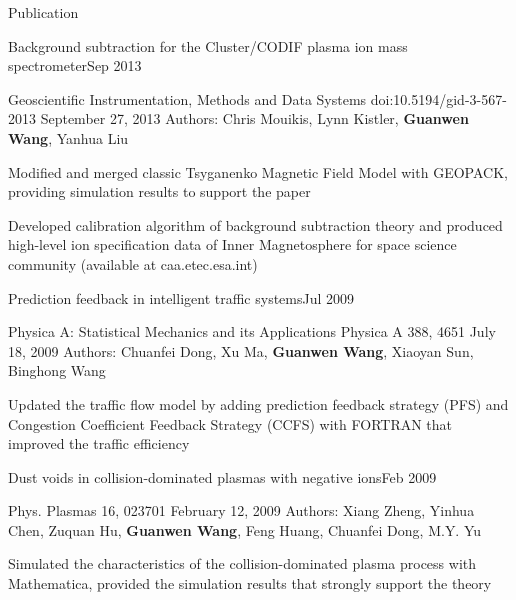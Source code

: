 \documentclass{resume} %
\begin{document}

\begin{rSection}{Publication}
\begin{rSubsection}{Background subtraction for the Cluster/CODIF plasma ion mass spectrometer}{Sep 2013}{}

\item Geoscientific Instrumentation, Methods and Data Systems doi:10.5194/gid-3-567-2013  September 27, 2013  Authors: Chris Mouikis, Lynn Kistler, {\bf Guanwen Wang}, Yanhua Liu   

\item Modified and merged classic Tsyganenko Magnetic Field Model with GEOPACK, providing simulation results to support the paper
\item Developed calibration algorithm of background subtraction theory and produced high-level ion specification data of Inner Magnetosphere for space science community (available at caa.etec.esa.int)

\end{rSubsection}

\begin{rSubsection}{Prediction feedback in intelligent traffic systems}{Jul 2009}{}

\item Physica A: Statistical Mechanics and its Applications Physica A 388, 4651  July 18, 2009  Authors: Chuanfei Dong, Xu Ma, {\bf Guanwen Wang}, Xiaoyan Sun, Binghong Wang

\item Updated the traffic flow model by adding prediction feedback strategy (PFS) and Congestion Coefficient Feedback Strategy (CCFS) with FORTRAN that improved the traffic efficiency

\end{rSubsection}

\begin{rSubsection}{Dust voids in collision-dominated plasmas with negative ions}{Feb 2009}{}

\item Phys. Plasmas 16, 023701  February 12, 2009  Authors: Xiang Zheng, Yinhua Chen, Zuquan Hu, {\bf Guanwen Wang}, Feng Huang, Chuanfei Dong, M.Y. Yu

\item Simulated the characteristics of the collision-dominated plasma process with Mathematica, provided the simulation results that strongly support the theory

\end{rSubsection}
\end{rSection}


\end{document}
